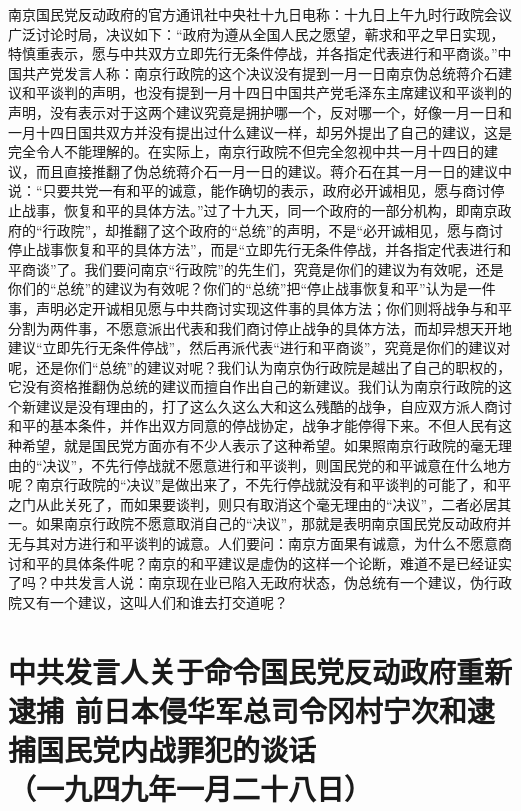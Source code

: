 \documentclass[cn,11pt,chinese]{elegantbook}
\def\myformat#1{\hfil\hfil #1}
\begin{document}
南京国民党反动政府的官方通讯社中央社十九日电称：十九日上午九时行政院会议广泛讨论时局，决议如下：“政府为遵从全国人民之愿望，蕲求和平之早日实现，特慎重表示，愿与中共双方立即先行无条件停战，并各指定代表进行和平商谈。”中国共产党发言人称：南京行政院的这个决议没有提到一月一日南京伪总统蒋介石建议和平谈判的声明，也没有提到一月十四日中国共产党毛泽东主席建议和平谈判的声明，没有表示对于这两个建议究竟是拥护哪一个，反对哪一个，好像一月一日和一月十四日国共双方并没有提出过什么建议一样，却另外提出了自己的建议，这是完全令人不能理解的。在实际上，南京行政院不但完全忽视中共一月十四日的建议，而且直接推翻了伪总统蒋介石一月一日的建议。蒋介石在其一月一日的建议中说：“只要共党一有和平的诚意，能作确切的表示，政府必开诚相见，愿与商讨停止战事，恢复和平的具体方法。”过了十九天，同一个政府的一部分机构，即南京政府的“行政院”，却推翻了这个政府的“总统”的声明，不是“必开诚相见，愿与商讨停止战事恢复和平的具体方法”，而是“立即先行无条件停战，并各指定代表进行和平商谈”了。我们要问南京“行政院”的先生们，究竟是你们的建议为有效呢，还是你们的“总统”的建议为有效呢？你们的“总统”把“停止战事恢复和平”认为是一件事，声明必定开诚相见愿与中共商讨实现这件事的具体方法；你们则将战争与和平分割为两件事，不愿意派出代表和我们商讨停止战争的具体方法，而却异想天开地建议“立即先行无条件停战”，然后再派代表“进行和平商谈”，究竟是你们的建议对呢，还是你们“总统”的建议对呢？我们认为南京伪行政院是越出了自己的职权的，它没有资格推翻伪总统的建议而擅自作出自己的新建议。我们认为南京行政院的这个新建议是没有理由的，打了这么久这么大和这么残酷的战争，自应双方派人商讨和平的基本条件，并作出双方同意的停战协定，战争才能停得下来。不但人民有这种希望，就是国民党方面亦有不少人表示了这种希望。如果照南京行政院的毫无理由的“决议”，不先行停战就不愿意进行和平谈判，则国民党的和平诚意在什么地方呢？南京行政院的“决议”是做出来了，不先行停战就没有和平谈判的可能了，和平之门从此关死了，而如果要谈判，则只有取消这个毫无理由的“决议”，二者必居其一。如果南京行政院不愿意取消自己的“决议”，那就是表明南京国民党反动政府并无与其对方进行和平谈判的诚意。人们要问：南京方面果有诚意，为什么不愿意商讨和平的具体条件呢？南京的和平建议是虚伪的这样一个论断，难道不是已经证实了吗？中共发言人说：南京现在业已陷入无政府状态，伪总统有一个建议，伪行政院又有一个建议，这叫人们和谁去打交道呢？\\
\newpage\section*{\myformat{中共发言人关于命令国民党反动政府重新逮捕
前日本侵华军总司令冈村宁次和逮捕国民党内战罪犯的谈话}\\\myformat{（一九四九年一月二十八日）}}
\end{document}
